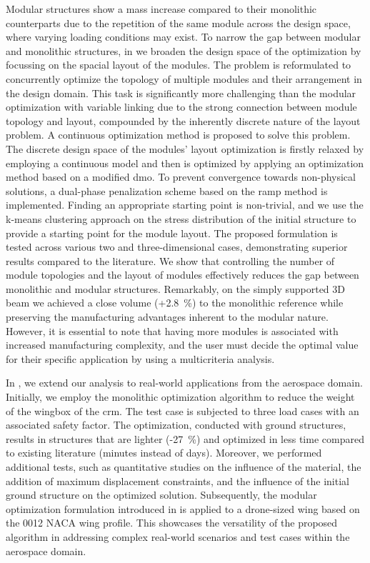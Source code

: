 Modular structures show a mass increase compared to their monolithic counterparts due to the repetition of the same module across the design space, where varying loading conditions may exist. To narrow the gap between modular and monolithic structures, in  we broaden the design space of the optimization by focussing on the spacial layout of the modules. The problem is reformulated to concurrently optimize the topology of multiple modules and their arrangement in the design domain. This task is significantly more challenging than the modular optimization with variable linking due to the strong connection between module topology and layout, compounded by the inherently discrete nature of the layout problem. A continuous optimization method is proposed to solve this problem. The discrete design space of the modules' layout optimization is firstly relaxed by employing a continuous model and then is optimized by applying an optimization method based on a modified \gls{dmo}. To prevent convergence towards non-physical solutions, a dual-phase penalization scheme based on the \gls{ramp} method is implemented. Finding an appropriate starting point is non-trivial, and we use the k-means clustering approach on the stress distribution of the initial structure to provide a starting point for the module layout. The proposed formulation is tested across various two and three-dimensional cases, demonstrating superior results compared to the literature. We show that controlling the number of module topologies and the layout of modules effectively reduces the gap between monolithic and modular structures. Remarkably, on the simply supported 3D beam we achieved a close volume (+\qty{2.8}{\percent}) to the monolithic reference while preserving the manufacturing advantages inherent to the modular nature. However, it is essential to note that having more modules is associated with increased manufacturing complexity, and the user must decide the optimal value for their specific application by using a multicriteria analysis.

In , we extend our analysis to real-world applications from the aerospace domain. Initially, we employ the monolithic optimization algorithm to reduce the weight of the wingbox of the \gls{crm}. The test case is subjected to three load cases with an associated safety factor. The optimization, conducted with ground structures, results in structures that are lighter (-\qty{27}{\%}) and optimized in less time compared to existing literature (minutes instead of days). Moreover, we performed additional tests, such as quantitative studies on the influence of the material, the addition of maximum displacement constraints, and the influence of the initial ground structure on the optimized solution. Subsequently, the modular optimization formulation introduced in  is applied to a drone-sized wing based on the 0012 NACA wing profile. This showcases the versatility of the proposed algorithm in addressing complex real-world scenarios and test cases within the aerospace domain.

